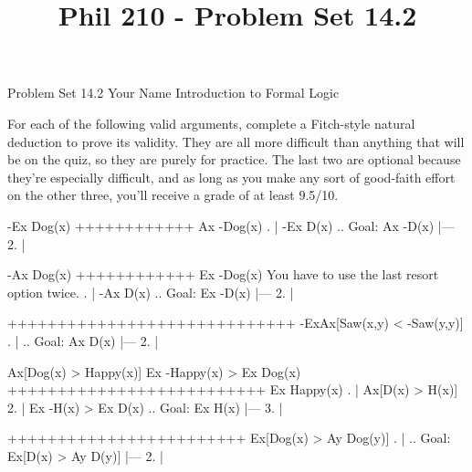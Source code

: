 
\title{Phil 210 - Problem Set 14.2}

\heading
Problem Set 14.2
Your Name
Introduction to Formal Logic
\endheading

For each of the following valid arguments, complete a Fitch-style natural deduction to prove its validity. They are all more difficult than anything that will be on the quiz, so they are purely for practice. The last two are optional because they're especially difficult, and as long as you make any sort of good-faith effort on the other three, you'll receive a grade of at least 9.5/10.

\quantifiers
\problems
{}
\argument
 -Ex Dog(x)
++++++++++++
 Ax -Dog(x)
\endargument
        \answer
        . | -Ex D(x)         ..  Goal: Ax -D(x)
            |---
         2. |
        \endfitchproof
        \endanswer

\argument
 -Ax Dog(x)
++++++++++++
 Ex -Dog(x)
\endargument
\Hint You have to use the last resort option twice.
        \answer
        . | -Ax D(x)              ..  Goal: Ex -D(x)
            |---
         2. |
        \endfitchproof
        \endanswer

\argument

+++++++++++++++++++++++++++++
 -ExAx[Saw(x,y) < -Saw(y,y)]
\endargument
        \answer
        . |                                   ..  Goal: Ax D(x)
            |---
         2. |
        \endfitchproof
        \endanswer

\resetasterisk
\problem{*}
\argument
 Ax[Dog(x) > Happy(x)]
 Ex -Happy(x) > Ex Dog(x)
++++++++++++++++++++++++++
 Ex Happy(x)
\endargument
        \answer
        . | Ax[D(x) > H(x)]
         2. | Ex -H(x) > Ex D(x)       ..  Goal: Ex H(x)
            |---
         3. |
        \endfitchproof
        \endanswer

\problem{**}
\argument

++++++++++++++++++++++++
 Ex[Dog(x) > Ay Dog(y)]
\endargument
        \answer
        . |                                     ..  Goal: Ex[D(x) > Ay D(y)]
            |---
         2. |
        \endfitchproof
        \endanswer

\endproblems
\bye
